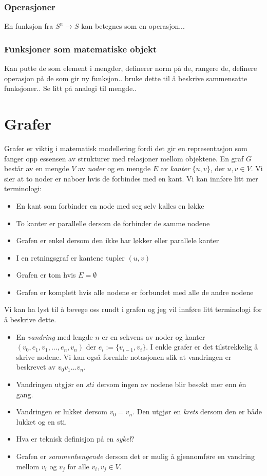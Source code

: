 \subsubsection{Operasjoner}
En funksjon fra $S^n \to S$ kan betegnes som en operasjon...
\subsubsection{Funksjoner som matematiske objekt}
Kan putte de som element i mengder, definerer norm på de, rangere de, definere operasjon på de som gir ny funksjon.. bruke dette til å beskrive sammensatte funksjoner.. Se litt på analogi til mengde..
\section{Grafer}
Grafer er viktig i matematisk modellering fordi det gir en representasjon som fanger opp essensen av strukturer med relasjoner mellom objektene. En graf $G$ består av en mengde $V$ av \textit{noder} og en mengde $E$ av \textit{kanter} $\{u,v\}$, der $u,v \in V$. Vi sier at to noder er naboer hvis de forbindes med en kant. Vi kan innføre litt mer terminologi:
\begin{itemize}
\item En kant som forbinder en node med seg selv kalles en løkke
\item To kanter er parallelle dersom de forbinder de samme nodene
\item Grafen er enkel dersom den ikke har løkker eller parallele kanter
\item I en retningsgraf er kantene tupler $(u,v)$
\item Grafen er tom hvis $E=\emptyset$
\item Grafen er komplett hvis alle nodene er forbundet med alle de andre nodene
\end{itemize}
Vi kan ha lyst til å bevege oss rundt i grafen og jeg vil innføre litt terminologi for å beskrive dette.
\begin{itemize}
\item En \textit{vandring} med lengde $n$ er en sekvens av noder og kanter $(v_0,e_1,v_1,\dots, e_n,v_n)$ der $e_i := \{v_{i-1},v_i\}$. I enkle grafer er det tilstrekkelig å skrive nodene. Vi kan også forenkle notasjonen slik at vandringen er beskrevet av $v_0v_1\dots v_n$.
\item Vandringen utgjør en $sti$ dersom ingen av nodene blir besøkt mer enn én gang.
\item Vandringen er lukket dersom $v_0 = v_n$. Den utgjør en \textit{krets} dersom den er både lukket og en sti.
\item Hva er teknisk definisjon på en \textit{sykel}?
\item Grafen er \textit{sammenhengende} dersom det er mulig å gjennomføre en vandring mellom $v_i$ og $v_j$ for alle $v_i, v_j \in V$. 
\end{itemize}
